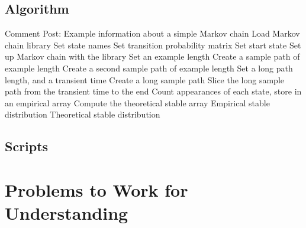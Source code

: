 \documentclass[12pt]{article}
\begin{document}
\subsection*{Algorithm}

\begin{codebox}
     \zi Comment Post:  Example
    information about a simple Markov chain \li Load Markov chain
    library \li Set state names \li Set transition probability matrix
    \li Set start state \li Set up Markov chain with the library \li Set
    an example length \li Create a sample path of example length \li
    Create a second sample path of example length \li Set a long path
    length, and a transient time \li Create a long sample path \li Slice
    the long sample path from the transient time to the end \li 
    Count appearances of each state, store in an empirical
    array \li Compute the theoretical stable array \li \Return Empirical
    stable distribution \li \Return Theoretical stable distribution
\end{codebox}

\subsection*{Scripts}



\hr

\section*{Problems to Work for Understanding}

\renewcommand{\theexerciseseries}{}
\renewcommand{\theexercise}{\arabic{exercise}}
\end{document}
